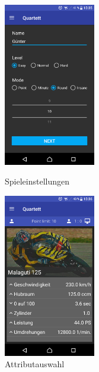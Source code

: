 \documentclass{scrartcl}
\begin{document}
\begin{figure}[!ht]
  \centering
  \begin{minipage}{0.45\textwidth}
    \centering
    \includegraphics[width=4cm]{img/game_settings.png}
    \caption{Spieleinstellungen}
  \end{minipage}
  \hfill
  \begin{minipage}{0.45\textwidth}
    \centering
    \includegraphics[width=4cm]{img/game_attributes.png}
    \caption{Attributauswahl}
  \end{minipage}
\end{figure}
\end{document}
